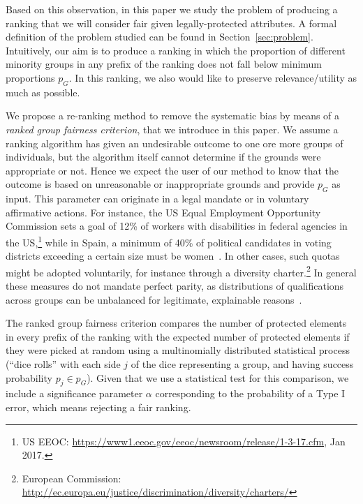 Based on this observation, in this paper we study the problem of producing a ranking that we will consider fair given legally-protected attributes.
%
A formal definition of the problem studied can be found in Section~\ref{sec:problem}.
%
Intuitively, our aim is to produce a ranking in which the proportion of different minority groups in any prefix of the ranking does not fall below minimum proportions $p_G$. In this ranking, we also would like to preserve relevance/utility as much as possible.
%
%

We propose a re-ranking method to remove the systematic bias by means of a \emph{ranked group fairness criterion}, that we introduce in this paper.
%
We assume a ranking algorithm has given an undesirable outcome to one ore more groups of individuals, but the algorithm itself cannot determine if the grounds were appropriate or not.
%
Hence we expect the user of our method to know that the outcome is based on unreasonable or inappropriate grounds and provide $p_G$ as input. This parameter can originate in a legal mandate or in voluntary affirmative actions.
%
For instance, the US Equal Employment Opportunity Commission sets a goal of 12\% of workers with disabilities in federal agencies in the US,\footnote{US EEOC: \url{https://www1.eeoc.gov/eeoc/newsroom/release/1-3-17.cfm}, Jan 2017.}
%
while in Spain, a minimum of 40\% of political candidates in voting districts exceeding a certain size must be women~\cite{verge2010gendering}.
%
In other cases, such quotas might be adopted voluntarily, for instance through a diversity charter.\footnote{European Commission: \url{http://ec.europa.eu/justice/discrimination/diversity/charters/}}
%
In general these measures do not mandate perfect parity, as distributions of qualifications across groups can be unbalanced for legitimate, explainable reasons~\cite{zliobaite2011handling,pedreschi2009integrating}. %
%

The ranked group fairness criterion compares the number of protected elements in every prefix of the ranking with the expected number of protected elements if they were picked at random using a multinomially distributed statistical process (``dice rolls'' with each side $j$ of the dice representing a group, and having success probability $p_j \in p_G$).
%
Given that we use a statistical test for this comparison, we include a significance parameter $\alpha$ corresponding to the probability of a Type I error, which means rejecting a fair ranking.
%

